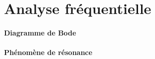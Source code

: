 \clearpage
\section{Analyse fréquentielle}

\paragraph{Diagramme de Bode}

\begin{figure}[!h]
\centering
{}

\end{figure}

\paragraph{Phénomène de résonance}

\begin{figure}[!h]
    \centering
    
\end{figure}

